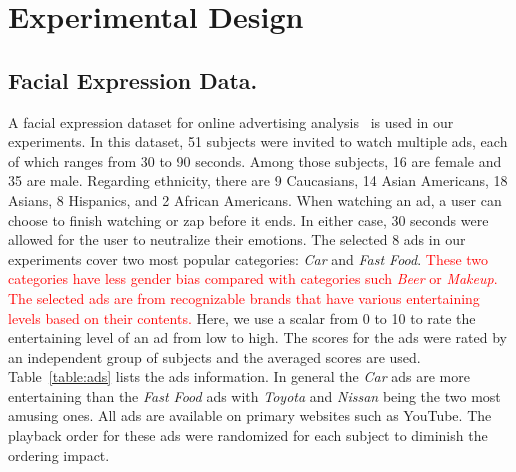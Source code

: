 \documentclass[twoside,leqno,twocolumn]{article}
\newcommand{\Songfan}[1]{\textcolor{red}{#1}}
\begin{document}
\section{Experimental Design}

\subsection{Facial Expression Data.}

A facial expression dataset for online advertising analysis~\cite{Yang_FG15} is used in our experiments. In this dataset, 51 subjects were invited to watch multiple ads, each of which ranges from 30 to 90 seconds. Among those subjects, 16 are female and 35 are male. Regarding ethnicity, there are 9 Caucasians, 14 Asian Americans, 18 Asians, 8 Hispanics, and 2 African Americans. When watching an ad, a user can choose to finish watching or zap before it ends. In either case, 30 seconds were allowed for the user to neutralize their emotions. The selected 8 ads in our experiments cover two most popular categories: \textit{Car} and \textit{Fast Food}. \Songfan{These two categories have less gender bias compared with categories such \textit{Beer} or \textit{Makeup}. The selected ads are from recognizable brands that have various entertaining levels based on their contents.} Here, we use a scalar from 0 to 10 to rate the entertaining level of an ad from low to high. The scores for the ads were rated by an independent group of subjects and the averaged scores are used. Table~\ref{table:ads} lists the ads information. In general the \textit{Car} ads are more entertaining than the \textit{Fast Food} ads with \textit{Toyota} and \textit{Nissan} being the two most amusing ones. All ads are available on primary websites such as YouTube. The playback order for these ads were randomized for each subject to diminish the ordering impact. 
\end{document}
